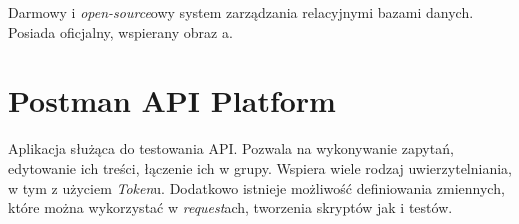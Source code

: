 \par Darmowy i \emph{open-source}owy system zarządzania relacyjnymi bazami danych. Posiada oficjalny, wspierany obraz \emph{\docker}a.

\section{Postman API Platform}

\par Aplikacja służąca do testowania API. Pozwala na wykonywanie zapytań, edytowanie ich treści, łączenie ich w grupy. Wspiera wiele rodzaj uwierzytelniania, w tym z użyciem \emph{Token}u. Dodatkowo istnieje możliwość definiowania zmiennych, które można wykorzystać w \emph{request}ach, tworzenia skryptów jak i testów.\cite{POSTMAN_DOCUMENTATION}